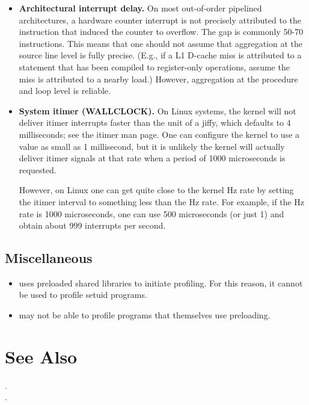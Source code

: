 \documentclass[english]{article}
\begin{document}
\begin{itemize}
\item \textbf{Architectural interrupt delay.}
On most out-of-order pipelined architectures, a hardware counter interrupt is not precisely attributed to the instruction that induced the counter to overflow.
The gap is commonly 50-70 instructions.
This means that one should not assume that aggregation at the source line level is fully precise.
(E.g., if a L1 D-cache miss is attributed to a statement that has been compiled to register-only operations, assume the miss is attributed to a nearby load.)
However, aggregation at the procedure and loop level is reliable.

\item \textbf{System itimer (WALLCLOCK).}
On Linux systems, the kernel will not deliver itimer interrupts faster than the unit of a jiffy, which defaults to 4 milliseconds; see the itimer man page.
One can configure the kernel to use a value as small as 1 millisecond, but it is unlikely the kernel will actually deliver itimer signals at that rate when a period of 1000 microseconds is requested.

However, on Linux one can get quite close to the kernel Hz rate by setting the itimer interval to something less than the Hz rate.
For example, if the Hz rate is 1000 microseconds, one can use 500 microseconds (or just 1) and obtain about 999 interrupts per second.
\end{itemize}



\subsection{Miscellaneous}

\begin{itemize}
  \item {} uses preloaded shared libraries to initiate profiling.  For this reason, it cannot be used to profile setuid programs.
  \item {} may not be able to profile programs that themselves use preloading.
\end{itemize}


\section{See Also}

.\\
.
\end{document}
